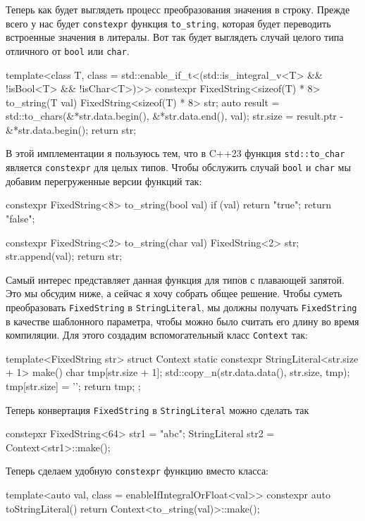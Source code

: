 Теперь как будет выглядеть процесс преобразования значения в строку.
Прежде всего у нас будет \verb"constexpr" функция \verb"to_string", которая будет переводить встроенные значения в литералы.
Вот так будет выглядеть случай целого типа отличного от \verb"bool" или \verb"char".
\begin{cppcode}
template<class T,
         class = std::enable_if_t<(std::is_integral_v<T> &&
                                   !isBool<T> && !isChar<T>)>>
constexpr FixedString<sizeof(T) * 8> to_string(T val) {
  FixedString<sizeof(T) * 8> str{};
  auto result = std::to_chars(&*str.data.begin(), &*str.data.end(), val);
  str.size = result.ptr - &*str.data.begin();
  return str;
}
\end{cppcode}
В этой имплементации я пользуюсь тем, что в C++23 функция \verb"std::to_char" является \verb"constexpr" для целых типов.
Чтобы обслужить случай \verb"bool" и \verb"char" мы добавим перегруженные версии функций так:
\begin{cppcode}
constexpr FixedString<8> to_string(bool val) {
  if (val)
    return "true";
  return "false";
}

constexpr FixedString<2> to_string(char val) {
  FixedString<2> str;
  str.append(val);
  return str;
}
\end{cppcode}
Самый интерес представляет данная функция для типов с плавающей запятой.
Это мы обсудим ниже, а сейчас я хочу собрать общее решение.
Чтобы суметь преобразовать \verb"FixedString" в \verb"StringLiteral", мы должны получать \verb"FixedString" в качестве шаблонного параметра, чтобы можно было считать его длину во время компиляции.
Для этого создадим вспомогательный класс \verb"Context" так:
\begin{cppcode}
template<FixedString str>
struct Context {
  static constexpr StringLiteral<str.size + 1> make() {
    char tmp[str.size + 1]{};
    std::copy_n(str.data.data(), str.size, tmp);
    tmp[str.size] = '\0';
    return tmp;
  }
};
\end{cppcode}
Теперь конвертация \verb"FixedString" в \verb"StringLiteral" можно сделать так
\begin{cppcode}
constepxr FixedString<64> str1 = "abc";
StringLiteral str2 = Context<str1>::make();
\end{cppcode}
Теперь сделаем удобную \verb"constexpr" функцию вместо класса:
\begin{cppcode}
template<auto val, class = enableIfIntegralOrFloat<val>>
constexpr auto toStringLiteral() {
  return Context<to_string(val)>::make();
}
\end{cppcode}
